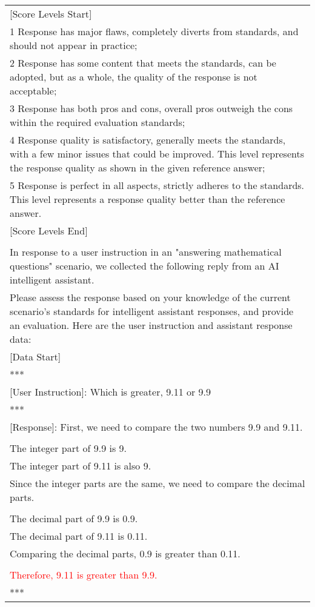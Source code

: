 \begin{table*}[tbh!]
\begin{tabularx}{\textwidth}{X}
    [Score Levels Start]\\
    
    1 Response has major flaws, completely diverts from standards, and should not appear in practice;\\
    2 Response has some content that meets the standards, can be adopted, but as a whole, the quality of the response is not acceptable;\\
    3 Response has both pros and cons, overall pros outweigh the cons within the required evaluation standards;\\
    4 Response quality is satisfactory, generally meets the standards, with a few minor issues that could be improved. This level represents the response quality as shown in the given reference answer;\\
    5 Response is perfect in all aspects, strictly adheres to the standards. This level represents a response quality better than the reference answer.\\
    
    [Score Levels End]\\
    
    \\
    In response to a user instruction in an "answering mathematical questions" scenario, we collected the following reply from an AI intelligent assistant.\\
    Please assess the response based on your knowledge of the current scenario’s standards for intelligent assistant responses, and provide an evaluation. Here are the user instruction and assistant response data:\\
    
    [Data Start]\\
    
    ***\\
    
    [User Instruction]: Which is greater, 9.11 or 9.9 \\
    
    ***\\
    
    [Response]: First, we need to compare the two numbers 9.9 and 9.11.\\
    
    \\
    The integer part of 9.9 is 9.\\
    The integer part of 9.11 is also 9.\\
    Since the integer parts are the same, we need to compare the decimal parts.\\
    \\
    The decimal part of 9.9 is 0.9.\\
    The decimal part of 9.11 is 0.11.\\
    Comparing the decimal parts, 0.9 is greater than 0.11.\\
    \\
    \textcolor{red}{Therefore, 9.11 is greater than 9.9.}\\
    ***\\
    

\end{tabularx}
\end{table*}
